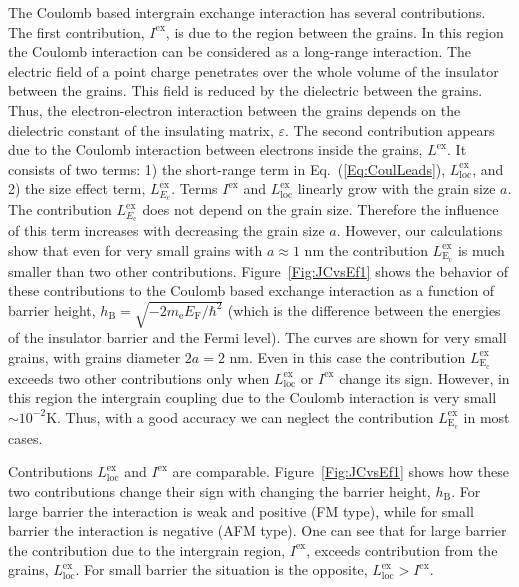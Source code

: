 \documentclass[aps,prb,amsmath,amssymb,twocolumn,superscriptaddress,showpacs,floatfix]{revtex4-1}
\begin{document}
The Coulomb based intergrain exchange interaction has several contributions.
The first contribution, $I^\mathrm{ex}$, is due to the region between the grains.
In this region the Coulomb interaction can be considered as a long-range interaction.
The electric field of a point charge penetrates over the whole volume of the
insulator between the grains. This field is reduced by the dielectric between
the grains. Thus, the electron-electron interaction between the grains
depends on the dielectric constant of the insulating matrix, $\varepsilon$.
The second contribution appears due to the Coulomb interaction between
electrons inside the grains, $L^\mathrm{ex}$. It consists of two terms:
1) the short-range term in Eq.~(\ref{Eq:CoulLeads}), $L_\mathrm{loc}^\mathrm{ex}$, and
2) the size effect term, $L^\mathrm{ex}_{E_\mathrm c}$.
Terms $I^\mathrm{ex}$ and $L_\mathrm{loc}^\mathrm{ex}$ linearly grow with the grain size $a$.
The contribution $L^\mathrm{ex}_{E_\mathrm c}$ does not depend on
the grain size. Therefore the influence of this term increases with decreasing
the grain size $a$. However, our calculations show that even for
very small grains with $a\approx 1$ nm the contribution
$L^\mathrm{ex}_\mathrm{E_\mathrm c}$ is much smaller than two other contributions.
Figure~\ref{Fig:JCvsEf1} shows the behavior of these contributions to the Coulomb based
exchange interaction as a function of barrier height, $h_\mathrm B=\sqrt{-2m_\mathrm e E_\mathrm F/\hbar^2}$
(which is the difference between the energies of the insulator barrier and the Fermi level).
The curves are shown for very small grains, with grains diameter $2a=2$ nm.
Even in this case the contribution
$L^\mathrm{ex}_\mathrm{E_\mathrm c}$ exceeds two other contributions
only when $L_\mathrm{loc}^\mathrm{ex}$ or $I^\mathrm{ex}$ change its sign.
However, in this region the intergrain coupling due to the Coulomb
interaction is very small $\sim 10^{-2}$K. Thus, with a good accuracy we can
neglect the contribution $L^\mathrm{ex}_\mathrm{E_\mathrm c}$ in most cases.



Contributions $L_\mathrm{loc}^\mathrm{ex}$ and $I^\mathrm{ex}$ are comparable.
Figure~\ref{Fig:JCvsEf1} shows how these two contributions change their sign with
changing the barrier height, $h_\mathrm B$. For large barrier the interaction
is weak and positive (FM type), while for small barrier the interaction is negative
(AFM type). One can see that for large barrier the contribution due to the
intergrain region, $I^\mathrm{ex}$, exceeds contribution from the grains, $L_\mathrm{loc}^\mathrm{ex}$.
For small barrier the situation is the opposite, $L_\mathrm{loc}^\mathrm{ex}>I^\mathrm{ex}$.
\end{document}

